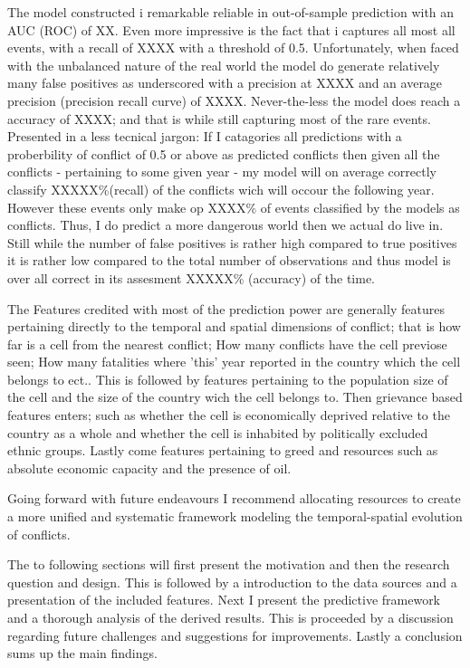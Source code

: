 \documentclass[a4paper]{article}
\begin{document}

The model constructed i remarkable reliable in out-of-sample prediction with an AUC (ROC) of XX. Even more impressive is the fact that i captures all most all events, with a recall of XXXX with a threshold of 0.5. Unfortunately, when faced with the unbalanced nature of the real world the model do generate relatively many false positives as underscored with a precision at XXXX and an average precision (precision recall curve) of XXXX. Never-the-less the model does reach a accuracy of XXXX; and that is while still capturing most of the rare events. Presented in a less tecnical jargon: If I catagories all predictions with a proberbility of conflict of 0.5 or above as predicted conflicts then given all the conflicts - pertaining to some given year - my model will on average correctly classify XXXXX\%(recall) of the conflicts wich will occour the following year. However these events only make op XXXX\% of events classified by the models as conflicts. Thus, I do predict a more dangerous world then we actual do live in. Still while the number of false positives is rather high compared to true positives it is rather low compared to the total number of observations and thus model is over all correct in its assesment XXXXX\% (accuracy) of the time.\par

The Features credited with most of the prediction power are generally features pertaining directly to the temporal and spatial dimensions of conflict; that is how far is a cell from the nearest conflict; How many conflicts have the cell previose seen; How many fatalities where 'this' year reported in the country which the cell belongs to ect.. This is followed by features pertaining to the population size of the cell and the size of the country wich the cell belongs to. Then grievance based features enters; such as whether the cell is economically deprived relative to the country as a whole and whether the cell is inhabited by politically excluded ethnic groups. Lastly come features pertaining to greed and resources such as absolute economic capacity and the presence of oil.\par

Going forward with future endeavours I recommend allocating resources to create a more unified and systematic framework modeling the temporal-spatial evolution of conflicts.


The to following sections will first present the motivation and then the research question and design. This is followed by a introduction to the data sources and a presentation of the included features. Next I present the predictive framework and a thorough analysis of the derived results. This is proceeded by a discussion regarding future challenges and suggestions for improvements. Lastly a conclusion sums up the main findings.\par
\end{document}
